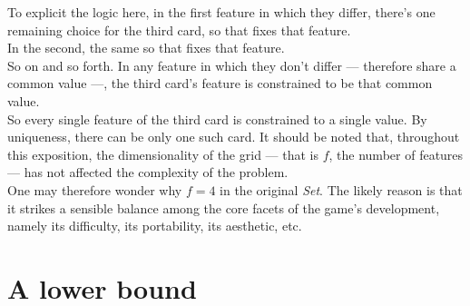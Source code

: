 \documentclass{article}
\theoremstyle{definition}
\theoremstyle{remark}
\begin{document}
\smallbreak
To explicit the logic here, in the first feature in which they differ, there’s one remaining choice for the third card, so that fixes that feature. \\
In the second, the same so that fixes that feature.
\\ So on and so forth.
In any feature in which they don’t differ --- therefore share a common value ---, the third card’s feature is constrained to be that common value.\\
So every single feature of the third card is constrained to a single value. By uniqueness, there can be only one such card.
\bigbreak
It should be noted that, throughout this exposition, the dimensionality of the grid --- that is $f$, the number of features --- has not affected the complexity of the problem.\\
One may therefore wonder why $f=4$ in the original \emph{Set}. The likely reason is that it strikes a sensible balance among the core facets of the game's development, namely its difficulty, its portability, its aesthetic, etc.

\section{A lower bound}\label{sec:lower}
\end{document}
